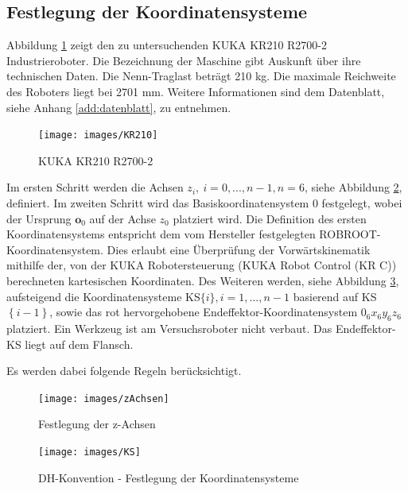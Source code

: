 \subsection*{Festlegung der Koordinatensysteme}
Abbildung \ref{fig:kr210} zeigt den zu untersuchenden KUKA KR210 R2700-2 Industrieroboter. Die Bezeichnung der Maschine gibt Auskunft über ihre technischen Daten.  Die Nenn-Traglast beträgt 210 kg. Die maximale Reichweite des Roboters liegt bei 2701 mm. Weitere Informationen sind dem Datenblatt, siehe Anhang \ref{add:datenblatt}, zu entnehmen.  

\begin{figure}[tbph]
	\centering
	\texttt{[image: images/KR210]}
	\caption{KUKA KR210 R2700-2}
	\label{fig:kr210}
\end{figure}

Im ersten Schritt werden die Achsen $z_i, \ i = 0,...,n-1, n=6$, siehe Abbildung \ref{fig:zachsen}, definiert. Im zweiten Schritt wird das Basiskoordinatensystem ${0}$ festgelegt, wobei der Ursprung $\bm{o}_0$ auf der Achse $z_0$ platziert wird. Die Definition des ersten Koordinatensystems entspricht dem vom Hersteller festgelegten ROBROOT-Koordinatensystem. Dies erlaubt eine Überprüfung der Vorwärtskinematik mithilfe der, von der KUKA Robotersteuerung (KUKA Robot Control (KR C)) berechneten kartesischen Koordinaten. Des Weiteren werden, siehe Abbildung \ref{fig:KS}, aufsteigend die Koordinatensysteme KS$\{i\},i=1,...,n-1$ basierend auf KS$\left\{i-1\right\}$, sowie das rot hervorgehobene Endeffektor-Koordinatensystem $0_6x_6y_6z_6$ platziert. Ein Werkzeug ist am Versuchsroboter nicht verbaut. Das Endeffektor-KS liegt auf dem Flansch.

Es werden dabei folgende Regeln berücksichtigt.  

\begin{figure}[tbph]
	\centering
	\texttt{[image: images/zAchsen]}
	\caption[]{Festlegung der z-Achsen}
	\label{fig:zachsen}
\end{figure}
%
\begin{figure}[tbph]
	\centering
	\texttt{[image: images/KS]}
	\caption{DH-Konvention - Festlegung der Koordinatensysteme}
	\label{fig:KS}
\end{figure}


